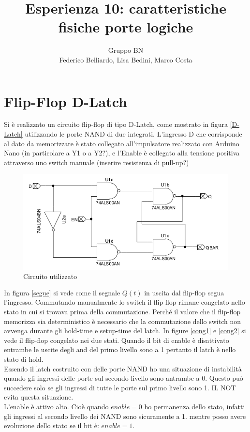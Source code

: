 \documentclass[10pt,a4paper]{article}
\author{Gruppo BN \\ Federico Belliardo, Lisa Bedini, Marco Costa}
\title{Esperienza 10: caratteristiche fisiche porte logiche}
\begin{document}
\maketitle

\section{Flip-Flop D-Latch}
Si è realizzato un circuito flip-flop di tipo D-Latch, come mostrato in figura \ref{D-Latch} utilizzando le porte NAND di due integrati. L'ingresso D che corrisponde al dato da memorizzare è stato collegato all'impulsatore realizzato con Arduino Nano (in particolare a Y1 o a Y2?), e l'Enable è collegato alla tensione positiva attraverso uno switch manuale (inserire resistenza di pull-up?)\\

\begin{figure}
\centering
\includegraphics[scale=0.7]{flipflopDlatch.png}
\caption{Circuito utilizzato\label{fig:circuito}}
\end{figure}

In figura \ref{segue} si vede come il segnale $Q(t)$ in uscita dal flip-flop segua l'ingresso. Commutando manualmente lo switch il flip flop rimane congelato nello stato in cui si trovava prima della commutazione. Perché il valore che il flip-flop memorizza sia deterministico è necessario che la commutazione dello switch non avvenga durante gli hold-time e setup-time del latch. In figure \ref{cong1} e \ref{cong2} si vede il flip-flop congelato nei due stati. Quando il bit di enable è disattivato entrambe le uscite degli and del primo livello sono a 1 pertanto il latch è nello stato di hold.\\

Essendo il latch costruito con delle porte NAND ho una situazione di instabilità quando gli ingressi delle porte sul secondo livello sono antrambe a 0. Questo può succedere solo se gli ingressi di tutte le porte sul primo livello sono 1. IL NOT evita questa situazione.\\
L'enable è attivo alto. Cioè quando $enable = 0$ ho permanenza dello stato, infatti gli ingressi al secondo livello dei NAND sono sicuramente a 1. mentre posso avere evoluzione dello stato se il bit è: $enable = 1$.\\
\end{document}

